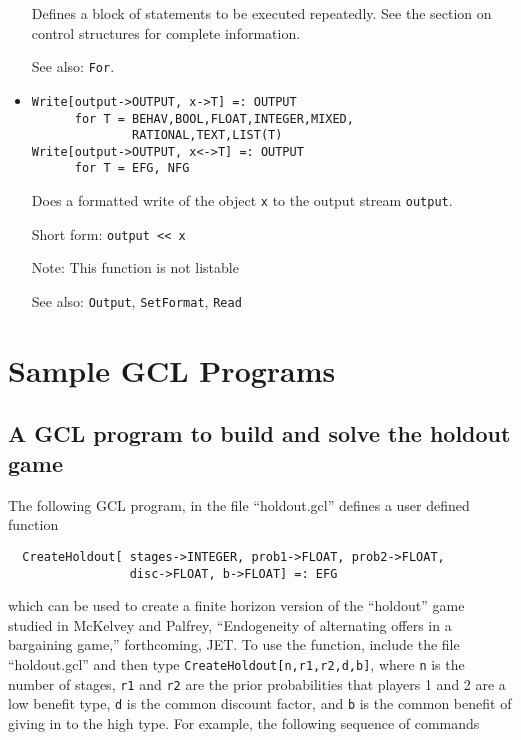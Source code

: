 \begin{itemize}
\bd
Defines a block of statements to be executed repeatedly.
See the section on control structures for complete information.
\item
[See also:] \verb+For+.
\ed

\item
\protect \large \begin{verbatim}
Write[output->OUTPUT, x->T] =: OUTPUT  
      for T = BEHAV,BOOL,FLOAT,INTEGER,MIXED,
              RATIONAL,TEXT,LIST(T)
Write[output->OUTPUT, x<->T] =: OUTPUT 
      for T = EFG, NFG
\end{verbatim}\normalsize

\bd
Does a formatted write of the object \verb+x+ to the
output stream \verb+output+.
\item
[Short form:] \verb+output << x+
\item
[Note:] This function is not listable
\item
[See also:] {\tt Output}, {\tt SetFormat}, {\tt Read}
\ed




\end{itemize}

\newpage
\section{Sample GCL Programs}


\subsection{A GCL program to build and solve the holdout game}

The following GCL program, in the file ``holdout.gcl'' defines a user
defined function

\protect \large \begin{verbatim}
  CreateHoldout[ stages->INTEGER, prob1->FLOAT, prob2->FLOAT, 
                 disc->FLOAT, b->FLOAT] =: EFG
\end{verbatim} \normalsize

\noindent
which can be used to create a finite horizon version of the
``holdout'' game studied in McKelvey and Palfrey, ``Endogeneity of
alternating offers in a bargaining game,'' forthcoming, JET.  To use
the function, include the file ``holdout.gcl'' and then type
\verb+CreateHoldout[n,r1,r2,d,b]+, where \verb+n+ is the number of
stages, \verb+r1+ and \verb+r2+ are the prior probabilities that
players 1 and 2 are a low benefit type, \verb+d+ is the common
discount factor, and \verb+b+ is the common benefit of giving in to
the high type.  For example, the following sequence of commands


